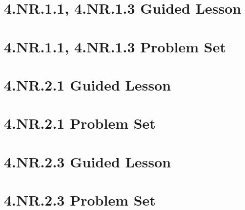 \documentclass[a4paper,12pt]{article}
\title{}
\date{}
\begin{document}

\hypertarget{toc}{}  %
\tableofcontents
\newpage



\pagestyle{fancy}  %


\newpage
\section{4.NR.1.1, 4.NR.1.3 Guided Lesson}


\newpage
\section{4.NR.1.1, 4.NR.1.3 Problem Set}


\newpage
\section{4.NR.2.1 Guided Lesson}


\newpage
\section{4.NR.2.1 Problem Set}


\newpage
\section{4.NR.2.3 Guided Lesson}


\newpage
\section{4.NR.2.3 Problem Set}


\newpage
\end{document}
